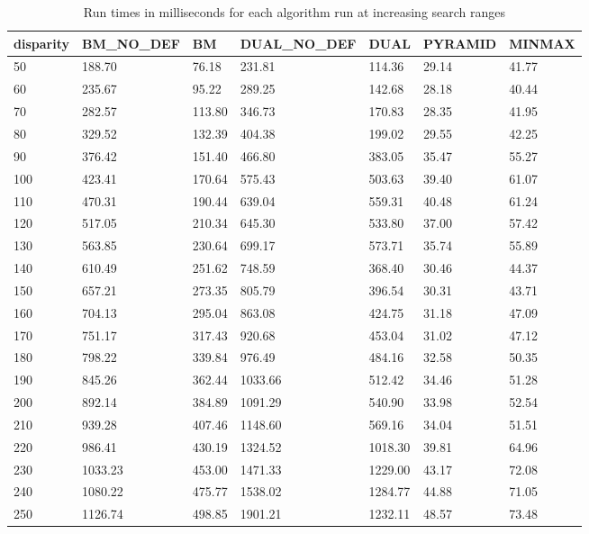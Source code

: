 \begin{table}
    \begin{tabular}{|l|l|l|l|l|l|l|}
        \hline
        disparity & BM\_NO\_DEF & BM     & DUAL\_NO\_DEF & DUAL    & PYRAMID & MINMAX \\ \hline
        50 & 188.70    & 76.18  & 231.81      & 114.36  & 29.14   & 41.77          \\
        60 & 235.67    & 95.22  & 289.25      & 142.68  & 28.18   & 40.44          \\
        70 & 282.57    & 113.80 & 346.73      & 170.83  & 28.35   & 41.95          \\
        80 & 329.52    & 132.39 & 404.38      & 199.02  & 29.55   & 42.25          \\
        90 & 376.42    & 151.40 & 466.80      & 383.05  & 35.47   & 55.27          \\
        100 & 423.41    & 170.64 & 575.43      & 503.63  & 39.40   & 61.07          \\
        110 & 470.31    & 190.44 & 639.04      & 559.31  & 40.48   & 61.24          \\
        120 & 517.05    & 210.34 & 645.30      & 533.80  & 37.00   & 57.42          \\
        130 & 563.85    & 230.64 & 699.17      & 573.71  & 35.74   & 55.89          \\
        140 & 610.49    & 251.62 & 748.59      & 368.40  & 30.46   & 44.37          \\
        150 & 657.21    & 273.35 & 805.79      & 396.54  & 30.31   & 43.71          \\
        160 & 704.13    & 295.04 & 863.08      & 424.75  & 31.18   & 47.09          \\
        170 & 751.17    & 317.43 & 920.68      & 453.04  & 31.02   & 47.12          \\
        180 & 798.22    & 339.84 & 976.49      & 484.16  & 32.58   & 50.35          \\
        190 & 845.26    & 362.44 & 1033.66     & 512.42  & 34.46   & 51.28          \\
        200 & 892.14    & 384.89 & 1091.29     & 540.90  & 33.98   & 52.54          \\
        210 & 939.28    & 407.46 & 1148.60     & 569.16  & 34.04   & 51.51          \\
        220 & 986.41    & 430.19 & 1324.52     & 1018.30 & 39.81   & 64.96          \\
        230 & 1033.23   & 453.00 & 1471.33     & 1229.00 & 43.17   & 72.08          \\
        240 & 1080.22   & 475.77 & 1538.02     & 1284.77 & 44.88   & 71.05          \\
        250 & 1126.74   & 498.85 & 1901.21     & 1232.11 & 48.57   & 73.48          \\
        \hline
    \end{tabular}
    \caption{Run times in milliseconds for each algorithm run at
      increasing search ranges}
\end{table}

